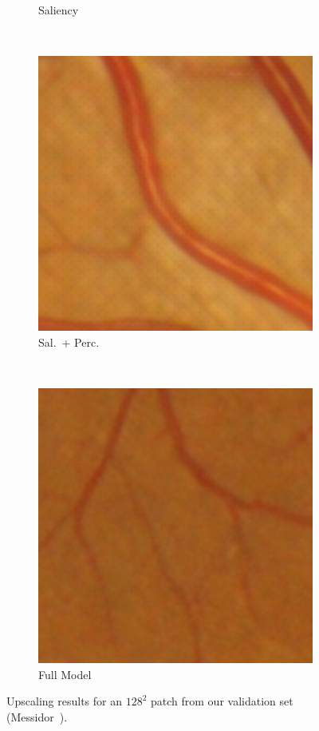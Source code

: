 \documentclass{scrartcl}
\begin{document}
\begin{figure}[h]
{\begin{subfigure}{0.2\textwidth}
    \caption{Saliency}
\end{subfigure}~
\begin{subfigure}{0.2\textwidth}
\centering
    \includegraphics[width=1.0\textwidth]{patch_sr1_sal_perc_small}
    \caption{Sal.\ + Perc.}
\end{subfigure}~
\begin{subfigure}{0.2\textwidth}
\centering
    \includegraphics[width=1.0\textwidth]{patch_sr1_gan_small}
    \caption{Full Model}
\end{subfigure}
}
\caption{Upscaling results for an $128^2$ patch from our validation set (Messidor~\cite{Messidor}).}
\label{fig:messidor-example}
\end{figure}
\end{document}
